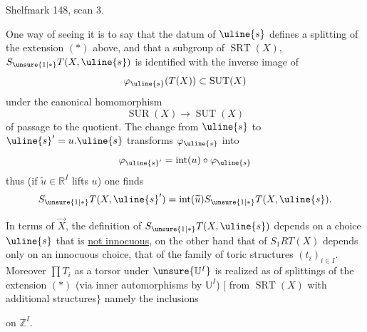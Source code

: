 Shelfmark 148, scan 3.


One way of seeing it is to say that
the datum of $\uline{s}$ defines a splitting
 of
the extension $(*)$ above, and that 
a subgroup of $\operatorname{SRT}(X)$,
$S_{\unsure{1|*}}T(X,\uline{s})$ is identified
with the inverse image of
\[
\varphi_{\uline{s}}(T(X))\subset\operatorname{SUT}(X)
\]
under the canonical homomorphism
\[
\operatorname{SUR}(X)\longrightarrow\operatorname{SUT}(X)
\]
of passage to the quotient. The change from
$\uline{s}$ to $\uline{s}'=u.\uline{s}$
transforms $\varphi_{\uline{s}}$ into
\[
\varphi_{\uline{s}'}=\operatorname{int}(u)\circ\varphi_{\uline{s}}
\]
thus (if $\widetilde u\in\mathbb R^I$ lifts $u$) one finds
\[
S_{\unsure{1|*}}T(X,\uline{s}')
=\operatorname{int}(\widetilde u)S_{\unsure{1|*}}T(X,\uline{s}).
\]

In terms of $\vec X$, the definition of
$S_{\unsure{1|*}}T(X,\uline{s})$
depends on a choice $\uline{s}$ that is \uline{not innocuous},
on the other hand that of $S_1RT(X)$ depends only on
an innocuous choice, that of the family of
toric structures $(t_i)_{i\in I}$.
Moreover $\prod T_i$ as
a torsor under $\unsure{\mathbb U^I}$ is realized
as  of splittings of the extension $(*)$
(via inner automorphisms by $\mathbb U^I$)
$\bigl[$ from $\operatorname{SRT}(X)$
with  additional structures$\bigr\}$
namely\unsure{)|,} the inclusions


 on $\mathbb Z^I$.

